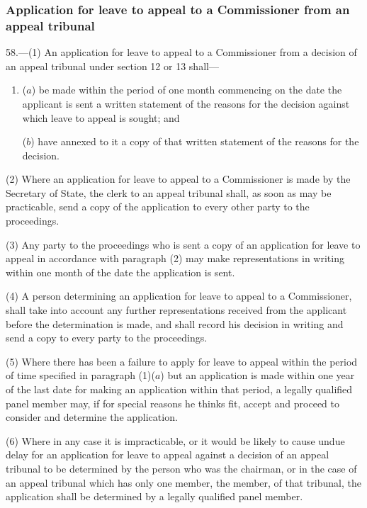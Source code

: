\documentclass[12pt,a4paper]{article}
\begin{document}
\subsubsection[58. Application for leave to appeal to a Commissioner from an appeal tribunal]{Application for leave to appeal to a Commissioner from an appeal tribunal}

58.—(1) An application for leave to appeal to a Commissioner from a decision of an appeal tribunal under section 12 or 13 shall—
\begin{enumerate}\item[]
($a$) be made within the period of one month commencing on the date the applicant is sent a written statement of the reasons for the decision against which leave to appeal is sought; and

($b$) have annexed to it a copy of that written statement of the reasons for the decision.
\end{enumerate}

(2) Where an application for leave to appeal to a Commissioner is made by the Secretary of State, the clerk to an appeal tribunal shall, as soon as may be practicable, send a copy of the application to every other party to the proceedings.

(3) Any party to the proceedings who is sent a copy of an application for leave to appeal in accordance with paragraph (2) may make representations in writing within one month of the date the application is sent.

(4) A person determining an application for leave to appeal to a Commissioner, shall take into account any further representations received from the applicant before the determination is made, and shall record his decision in writing and send a copy to every party to the proceedings.

(5) Where there has been a failure to apply for leave to appeal within the period of time specified in paragraph (1)($a$) but an application is made within one year of the last date for making an application within that period, a legally qualified panel member may, if for special reasons he thinks fit, accept and proceed to consider and determine the application.

(6) Where in any case it is impracticable, or it would be likely to cause undue delay for an application for leave to appeal against a decision of an appeal tribunal to be determined by the person who was the chairman, or in the case of an appeal tribunal which has only one member, the member, of that tribunal, the application shall be determined by a legally qualified panel member.
\end{document}

